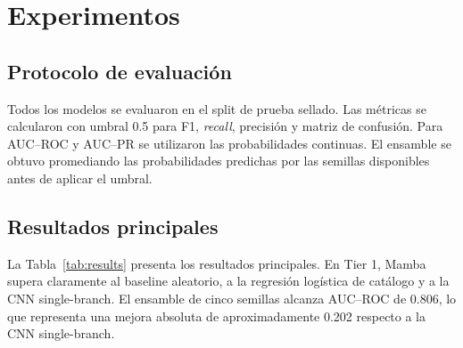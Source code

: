 \documentclass[conference]{IEEEtran}
\newcommand{\aucroc}{AUC--ROC}
\newcommand{\aucpr}{AUC--PR}
\begin{document}
\section{Experimentos}

\subsection{Protocolo de evaluación}

Todos los modelos se evaluaron en el split de prueba sellado. Las métricas se calcularon con umbral 0.5 para F1, \textit{recall}, precisión y matriz de confusión. Para \aucroc{} y \aucpr{} se utilizaron las probabilidades continuas. El ensamble se obtuvo promediando las probabilidades predichas por las semillas disponibles antes de aplicar el umbral.

\subsection{Resultados principales}

La Tabla~\ref{tab:results} presenta los resultados principales. En Tier 1, Mamba supera claramente al baseline aleatorio, a la regresión logística de catálogo y a la CNN single-branch. El ensamble de cinco semillas alcanza \aucroc{} de 0.806, lo que representa una mejora absoluta de aproximadamente 0.202 respecto a la CNN single-branch.
\end{document}
